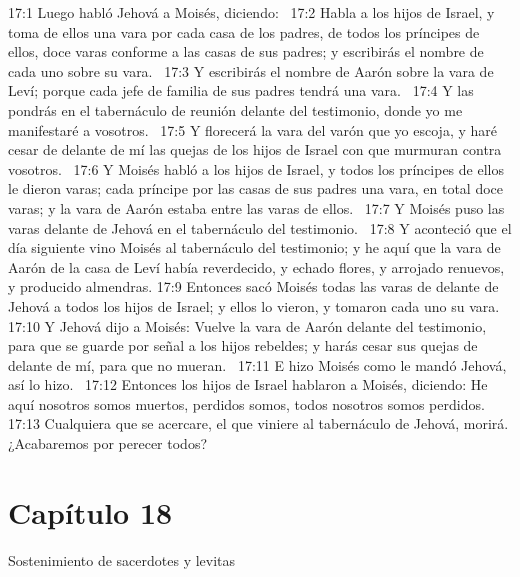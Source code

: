 17:1 Luego habló Jehová a Moisés, diciendo:  
17:2 Habla a los hijos de Israel, y toma de ellos una vara por cada casa de los padres, de todos los príncipes de ellos, doce varas conforme a las casas de sus padres; y escribirás el nombre de cada uno sobre su vara.  
17:3 Y escribirás el nombre de Aarón sobre la vara de Leví; porque cada jefe de familia de sus padres tendrá una vara.  
17:4 Y las pondrás en el tabernáculo de reunión delante del testimonio, donde yo me manifestaré a vosotros.  
17:5 Y florecerá la vara del varón que yo escoja, y haré cesar de delante de mí las quejas de los hijos de Israel con que murmuran contra vosotros.  
17:6 Y Moisés habló a los hijos de Israel, y todos los príncipes de ellos le dieron varas; cada príncipe por las casas de sus padres una vara, en total doce varas; y la vara de Aarón estaba entre las varas de ellos.  
17:7 Y Moisés puso las varas delante de Jehová en el tabernáculo del testimonio.  
17:8 Y aconteció que el día siguiente vino Moisés al tabernáculo del testimonio; y he aquí que la vara de Aarón de la casa de Leví había reverdecido, y echado flores, y arrojado renuevos, y producido almendras. 
17:9 Entonces sacó Moisés todas las varas de delante de Jehová a todos los hijos de Israel; y ellos lo vieron, y tomaron cada uno su vara.  
17:10 Y Jehová dijo a Moisés: Vuelve la vara de Aarón delante del testimonio, para que se guarde por señal a los hijos rebeldes; y harás cesar sus quejas de delante de mí, para que no mueran.  
17:11 E hizo Moisés como le mandó Jehová, así lo hizo.  
17:12 Entonces los hijos de Israel hablaron a Moisés, diciendo: He aquí nosotros somos muertos, perdidos somos, todos nosotros somos perdidos.  
17:13 Cualquiera que se acercare, el que viniere al tabernáculo de Jehová, morirá. ¿Acabaremos por perecer todos?  
\section*{Capítulo 18 }
Sostenimiento de sacerdotes y levitas  

